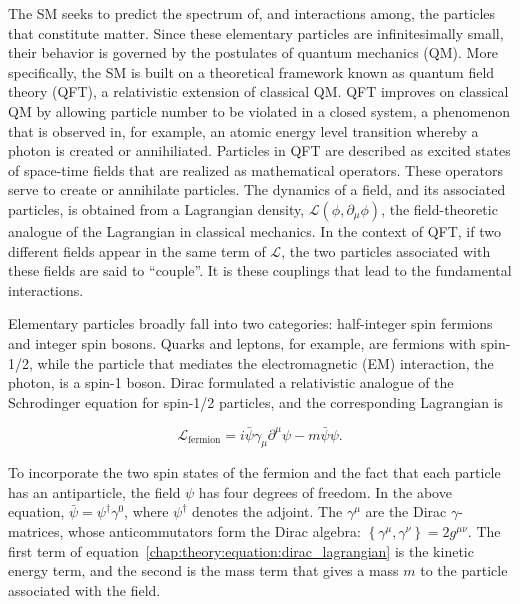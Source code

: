 
The SM seeks to predict the spectrum of, and
interactions among, the particles that constitute matter. Since these
elementary particles are infinitesimally small, their behavior is
governed by the postulates of quantum mechanics (QM). More
specifically, the SM is built on a theoretical framework known as
quantum field theory (QFT), a relativistic extension of classical
QM. QFT improves on classical QM by allowing particle number
to be violated in a closed system, a phenomenon that is observed in,
for example, an atomic energy level transition whereby a photon is
created or annihiliated. Particles in QFT are described as excited states
of space-time fields that are realized as mathematical
operators. These operators serve to create or annihilate particles. The
dynamics of a field, and its associated
particles, is obtained from a Lagrangian density,
$\mathcal{L}(\phi,\partial_{\mu}\phi)$, the field-theoretic
analogue of the Lagrangian in classical mechanics. In the context of
QFT, if two different fields appear in the same term of $\mathcal{L}$, the two
particles associated with these fields are said to ``couple''. It is
these couplings that lead to the fundamental interactions. 

Elementary particles broadly fall into two categories: half-integer
spin fermions and integer spin bosons. Quarks and leptons, for example, are fermions
with spin-1/2, while the particle that mediates the electromagnetic
(EM) interaction, the photon, is a spin-1 boson. Dirac formulated a
relativistic analogue of the Schrodinger equation for spin-1/2
particles, and the corresponding Lagrangian is

\begin{equation}
\mathcal{L}_{\textrm{fermion}} =
i\bar{\psi}\gamma_{\mu}\partial^{\mu}\psi - m\bar{\psi}\psi.
\label{chap:theory:equation:dirac_lagrangian}
\end{equation}

\noindent
To incorporate the two spin states of the fermion and the
fact that each particle has an antiparticle, the field $\psi$ has four
degrees of freedom. In the above equation, $\bar{\psi} =
\psi^{\dagger}\gamma^0$, where $\psi^{\dagger}$ denotes the
adjoint. The $\gamma^{\mu}$ are the Dirac $\gamma$-matrices,
whose anticommutators form the Dirac algebra:
$\left\{\gamma^{\mu},\gamma^{\nu}\right\} = 2g^{\mu\nu}$. The first term
of equation~\ref{chap:theory:equation:dirac_lagrangian} is the kinetic
energy term, and the second is the mass term that gives a mass $m$ to
the particle associated with the field. 


